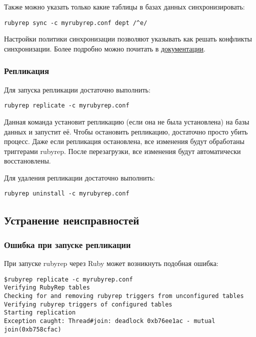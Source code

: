 Также можно указать только какие таблицы в базах данных синхронизировать:
\begin{lstlisting}[label=lst:rubyrep9,caption=Синхронизация баз данных]
rubyrep sync -c myrubyrep.conf dept /^e/
\end{lstlisting}

Настройки политики синхронизации позволяют указывать как решать конфликты синхронизации.
Более подробно можно почитать в \href{http://www.rubyrep.org/configuration.html}{документации}.

\subsubsection{Репликация}
Для запуска репликации достаточно выполнить:
\begin{lstlisting}[label=lst:rubyrep10,caption=Репликация]
rubyrep replicate -c myrubyrep.conf
\end{lstlisting}

Данная команда установит репликацию (если она не была установлена) на базы данных и запустит её.
Чтобы остановить репликацию, достаточно просто убить процесс. Даже если репликация остановлена,
все изменения будут обработаны триггерами rubyrep. После перезагрузки, все изменения
будут автоматически восстановлены.

Для удаления репликации достаточно выполнить:
\begin{lstlisting}[label=lst:rubyrep11,caption=Репликация]
rubyrep uninstall -c myrubyrep.conf
\end{lstlisting}

\subsection{Устранение неисправностей}
\subsubsection{Ошибка при запуске репликации}
При запуске rubyrep через Ruby может возникнуть подобная ошибка:
\begin{lstlisting}[label=lst:rubyrep12,caption=Устранение неисправностей]
$rubyrep replicate -c myrubyrep.conf
Verifying RubyRep tables
Checking for and removing rubyrep triggers from unconfigured tables
Verifying rubyrep triggers of configured tables
Starting replication
Exception caught: Thread#join: deadlock 0xb76ee1ac - mutual join(0xb758cfac)
\end{lstlisting}


